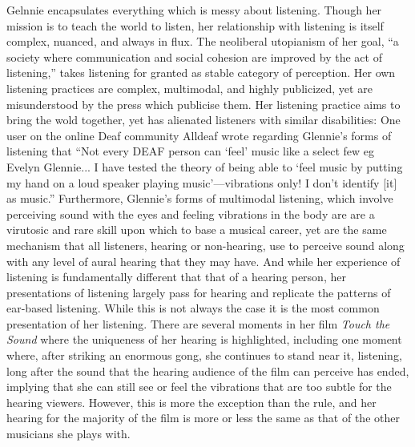 \documentclass[12pt,letterpaper]{article}
\begin{document}
	Gelnnie encapsulates everything which is messy about listening. Though 
	her mission is to teach the world to listen, her relationship with 
	listening is itself complex, nuanced, and always in flux. The 
	neoliberal utopianism of her goal, ``a society where communication and 
	social cohesion are improved by the act of 
	listening,''\autocite{GlennieOnline} takes listening
	for granted as stable category of perception. Her own listening 
	practices are complex, multimodal, and highly publicized, yet are 
	misunderstood by the press which publicise them. Her listening practice
	aims to bring the wold together, yet has alienated listeners with similar 
	disabilities: One user on the online Deaf community Alldeaf wrote
	regarding Glennie's forms of listening that ``Not every DEAF person can
	 `feel' music like a select few eg Evelyn Glennie... I have tested the 
	theory of being able to `feel music by putting my hand on a loud speaker
	playing music'---vibrations only! I don’t identify [it] as
	music.''\autocite[184]{Holmes} Furthermore, Glennie's forms of
	multimodal listening, which involve 
	perceiving sound with the eyes and feeling vibrations in the body are 
	are a virutosic and rare skill upon which to base a musical career, yet
	are the same mechanism that all listeners, hearing or 
	non-hearing, use to perceive sound along with any level of aural 
	hearing that they may have. And while her experience of listening is
	fundamentally different that that of a hearing person, her 
	presentations of listening largely pass for hearing and replicate the
	patterns of ear-based listening. While this is not always the case it
	is the most common presentation of her listening. There are several
	moments in her film \textit{Touch the Sound} where the uniqueness of 
	her hearing is highlighted, including one moment where, after striking
	an enormous gong, she continues to stand near it, listening, long after
	the sound that the hearing audience of the film can perceive has ended,
	implying that she can still see or feel the vibrations that are too 
	subtle for the hearing viewers. However, this is more the exception
	than the rule, and her hearing for the majority of the film is more or
	less the same as that of the other musicians she plays with.  
\end{document}
